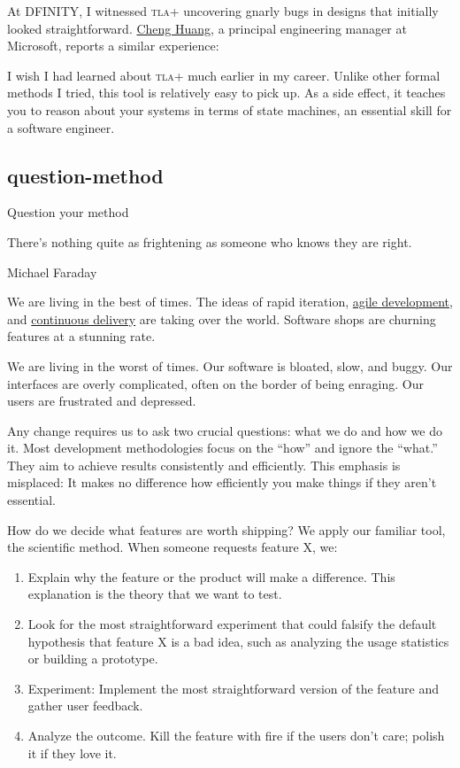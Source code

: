 \documentclass{article}
\begin{document}
At DFINITY, I witnessed \textsc{tla+} uncovering gnarly bugs in designs that initially looked straightforward.
\href{https://www.linkedin.com/in/chenghuang/}{Cheng Huang}, a principal engineering manager at Microsoft, reports a similar experience:

I wish I had learned about \textsc{tla+} much earlier in my career.
Unlike other formal methods I tried, this tool is relatively easy to pick up.
As a side effect, it teaches you to reason about your systems in terms of state machines,
an essential skill for a software engineer.

\subsection{question-method}{Question your method}
\epigraph{
  There's nothing quite as frightening as someone who knows they are right.
}{Michael Faraday}

We are living in the best of times.
The ideas of rapid iteration, \href{https://agilemanifesto.org/}{agile development}, and \href{https://continuousdelivery.com/}{continuous delivery} are taking over the world.
Software shops are churning features at a stunning rate.

We are living in the worst of times.
Our software is bloated, slow, and buggy.
Our interfaces are overly complicated, often on the border of being enraging.
Our users are frustrated and depressed.

Any change requires us to ask two crucial questions: what we do and how we do it.
Most development methodologies focus on the ``how'' and ignore the ``what.''
They aim to achieve results consistently and efficiently.
This emphasis is misplaced:
It makes no difference how efficiently you make things if they aren't essential.

How do we decide what features are worth shipping?
We apply our familiar tool, the scientific method.
When someone requests feature X, we:
\begin{enumerate}
\item Explain why the feature or the product will make a difference.
This explanation is the theory that we want to test.
\item Look for the most straightforward experiment that could falsify the default hypothesis that feature X is a bad idea, such as analyzing the usage statistics or building a prototype.
\item Experiment: Implement the most straightforward version of the feature and gather user feedback.
\item Analyze the outcome.
Kill the feature with fire if the users don't care; polish it if they love it.
\end{enumerate}
\end{document}
